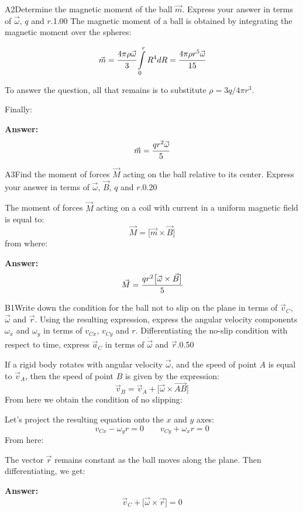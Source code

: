 \documentclass[11pt,a4paper]{article}
\begin{document}
\begin{solcard}{A2}{Determine the magnetic moment of the ball $\vec{m}$. Express your answer in terms of $\vec{\omega}$, $q$ and $r$.}{1.00}
The magnetic moment of a ball is obtained by integrating the magnetic moment over the spheres:


$$\vec{m}=\cfrac{4\pi\rho\vec{\omega}}{3}\int\limits_{0}^rR^4dR=\cfrac{4\pi\rho{r}^5\vec{\omega}}{15} $$


To answer the question, all that remains is to substitute $\rho=3q/4\pi{r}^3$.


Finally:

\par\smallskip\noindent\textbf{Answer:} $$\vec{m}=\cfrac{qr^2\vec{\omega}}{5} $$
\end{solcard}

\begin{solcard}{A3}{Find the moment of forces $\vec{M}$ acting on the ball relative to its center. Express your answer in terms of $\vec{\omega}$, $\vec{B}$, $q$ and $r$.}{0.20}

The moment of forces $\vec{M}$ acting on a coil with current in a uniform magnetic field is equal to: $$\vec{M}=\bigl[\vec{m}\times\vec{B}\bigr] $$from where:

\par\smallskip\noindent\textbf{Answer:} $$\vec{M}=\cfrac{qr^2\bigl[\vec{\omega}\times\vec{B}\bigr]}{5} $$
\end{solcard}

\begin{solcard}{B1}{Write down the condition for the ball not to slip on the plane in terms of $\vec{v}_C$, $\vec{\omega}$ and $\vec{r}$. Using the resulting expression, express the angular velocity components $\omega_x$ and $\omega_y$ in terms of $v_{Cx}$, $v_{Cy}$ and $r$. Differentiating the no-slip condition with respect to time, express $\vec{a}_C$ in terms of $\dot{\vec{\omega}}$ and $\vec{r}$.}{0.50}

If a rigid body rotates with angular velocity $\vec{\omega}$, and the speed of point $A$ is equal to $\vec{v}_A$, then the speed of point $B$ is given by the expression: $$\vec{v}_B=\vec{v}_A+\bigl[\vec{\omega}\times\overrightarrow{AB}\bigr] $$From here we obtain the condition of no slipping:


Let's project the resulting equation onto the $x$ and $y$ axes: $$v_{Cx}-\omega_yr=0\qquad v_{Cy}+\omega_xr=0 $$From here:


The vector $\vec{r}$ remains constant as the ball moves along the plane. Then differentiating, we get:

\par\smallskip\noindent\textbf{Answer:} $$\vec{v}_C+\bigl[\vec{\omega}\times\vec{r}\bigr]=0 $$
\end{solcard}
\end{document}
